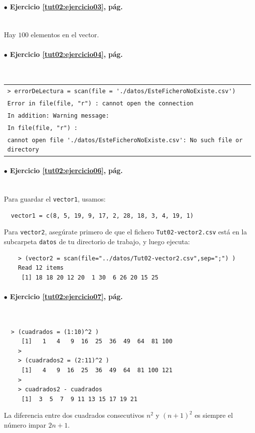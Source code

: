 \documentclass[10pt,a4paper]{article}\usepackage[]{graphicx}\usepackage[]{color}
\begin{document}
\paragraph{\bf $\bullet$ Ejercicio \ref{tut02:ejercicio03}, pág. \pageref{tut02:ejercicio03}}
\label{tut02:ejercicio03:sol}\quad\\
Hay $100$ elementos en el vector.

\paragraph{\bf $\bullet$ Ejercicio \ref{tut02:ejercicio04}, pág. \pageref{tut02:ejercicio04}}
\label{tut02:ejercicio04:sol}\quad\\
\begin{center}
\begin{tabular}{l}
\color{blue} {\verb#> errorDeLectura = scan(file = './datos/EsteFicheroNoExiste.csv')#}\\
\color{red} {\tt Error in file(file, \verb/"/r\verb/"/) : cannot open the connection}\\
\color{red} {\tt In addition: Warning message:}\\
\color{red} {\tt In file(file, \verb/"/r\verb/"/) :}\\
\color{red} {\quad \verb#cannot open file './datos/EsteFicheroNoExiste.csv': No such file or directory#}
\end{tabular}
\end{center}
\color{black}

\paragraph{\bf $\bullet$ Ejercicio \ref{tut02:ejercicio06}, pág. \pageref{tut02:ejercicio06}}
\label{tut02:ejercicio06:sol}\quad\\
Para guardar el {\tt vector1}, usamos:
\begin{verbatim}
  vector1 = c(8, 5, 19, 9, 17, 2, 28, 18, 3, 4, 19, 1)
\end{verbatim}
Para {\tt vector2}, asegúrate primero de que el fichero {\tt Tut02-vector2.csv} está en la subcarpeta {\tt datos} de tu directorio de trabajo, y luego ejecuta:
\begin{verbatim}
    > (vector2 = scan(file="../datos/Tut02-vector2.csv",sep=";") )
    Read 12 items
     [1] 18 18 20 12 20  1 30  6 26 20 15 25
\end{verbatim}

\paragraph{\bf $\bullet$ Ejercicio \ref{tut02:ejercicio07}, pág. \pageref{tut02:ejercicio07}}
\label{tut02:ejercicio07:sol}\quad\\
\begin{verbatim}
  > (cuadrados = (1:10)^2 )
     [1]   1   4   9  16  25  36  49  64  81 100
    >
    > (cuadrados2 = (2:11)^2 )
     [1]   4   9  16  25  36  49  64  81 100 121
    >
    > cuadrados2 - cuadrados
     [1]  3  5  7  9 11 13 15 17 19 21
\end{verbatim}
La diferencia entre dos cuadrados consecutivos $n^2$  y $(n+1)^2$ es siempre el número impar $2n+1$.
\end{document}
